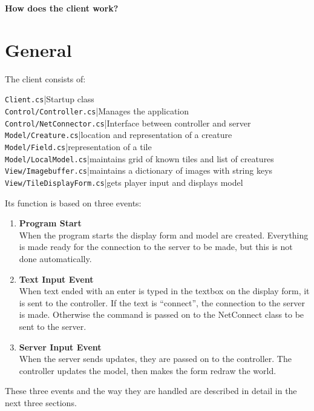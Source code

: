 \documentclass{article}
\begin{document}
	\textbf{\Large{How does the client work?}}
	
	\section{General}
		The client consists of:
		
			\texttt{Client.cs}|Startup class\\
			\texttt{Control/Controller.cs}|Manages the application\\
			\texttt{Control/NetConnector.cs}|Interface between controller and server\\
			\texttt{Model/Creature.cs}|location and representation of a creature\\
			\texttt{Model/Field.cs}|representation of a tile\\
			\texttt{Model/LocalModel.cs}|maintains grid of known tiles and list of creatures\\
			\texttt{View/Imagebuffer.cs}|maintains a dictionary of images with string keys\\
			\texttt{View/TileDisplayForm.cs}|gets player input and displays model
		
		Its function is based on three events:
		
		\begin{enumerate}
			\item
				\textbf{Program Start}\\
				When the program starts the display form and model are created. Everything is made ready for the connection to the server to be made, but this is not done automatically.
			\item
				\textbf{Text Input Event}\\
				When text ended with an enter is typed in the textbox on the display form, it is sent to the controller. If the text is ``connect'', the connection to the server is made. Otherwise the command is passed on to
				the NetConnect class to be sent to the server.
			\item
				\textbf{Server Input Event}\\
				When the server sends updates, they are passed on to the controller. The controller updates the model, then makes the form redraw the world.
		\end{enumerate}
		
		These three events and the way they are handled are described in detail in the next three sections.
\end{document}
